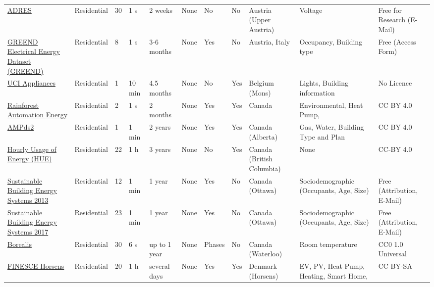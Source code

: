 \begin{tabular}{lllllllllll}
\href{\url{https://www.ea.tuwien.ac.at/projects/adres_concept/EN/}}{ADRES} & Residential &30 &  1 s &  2 weeks &  None &  No &  No &Austria (Upper Austria) &Voltage &  Free for Research (E-Mail) \\
\href{\url{https://sourceforge.net/projects/greend/}}{GREEND Electrical Energy Dataset (GREEND)} & Residential & 8 &  1 s &   3-6 months &  None & Yes &  No & Austria, Italy &   Occupancy, Building type &  Free (Access Form) \\
\href{\url{https://archive.ics.uci.edu/ml/datasets/Appliances+energy+prediction}}{UCI Appliances} & Residential & 1 &   10 min &   4.5 months &  None &  No & Yes & Belgium (Mons) &   Lights, Building information &  No Licence \\
\href{\url{https://dataverse.harvard.edu/dataset.xhtml?persistentId=doi:10.7910/DVN/ZJW4LC}}{Rainforest Automation Energy} & Residential & 2 &  1 s & 2 months &  None & Yes & Yes & Canada &  Environmental, Heat Pump, &   CC BY 4.0 \\
\href{\url{https://dataverse.harvard.edu/dataset.xhtml?persistentId=doi:10.7910/DVN/FIE0S4}}{AMPds2} & Residential & 1 &1 min &  2 years &  None & Yes & Yes &   Canada (Alberta) & Gas, Water, Building Type and Plan &   CC BY 4.0 \\
\href{\url{https://dataverse.harvard.edu/dataset.xhtml?persistentId=doi:10.7910/DVN/N3HGRN}}{Hourly Usage of Energy (HUE)} & Residential &22 &  1 h &  3 years &  None &  No & Yes &  Canada (British Columbia) &   None &   CC-BY 4.0 \\
\href{\url{https://carleton.ca/sbes/publications/electric-demand-profiles-downloadable/}}{Sustainable Building Energy Systems 2013} & Residential &12 &1 min &   1 year &  None & Yes &  No &Canada (Ottawa) &Sociodemographic (Occupants, Age, Size) &  Free (Attribution, E-Mail) \\
\href{\url{https://carleton.ca/sbes/publications/electric-demand-profiles-downloadable/}}{Sustainable Building Energy Systems 2017} & Residential &23 &1 min &   1 year &  None & Yes &  No &Canada (Ottawa) &Sociodemographic (Occupants, Age, Size) &  Free (Attribution, E-Mail) \\
\href{\url{https://doi.org/10.5683/SP2/R4SVBF}}{Borealis} & Residential &30 &  6 s & up to 1 year &  None &  Phases &  No &  Canada (Waterloo) &   Room temperature &   CC0 1.0 Universal \\
\href{\url{https://data.lab.fiware.org/organization/9569f9bd-42bd-414f-b8d9-112553ea9dfb?tags=FINESCE}}{FINESCE Horsens} & Residential &20 &  1 h & several days &  None & Yes & Yes &  Denmark (Horsens) &EV, PV, Heat Pump, Heating, Smart Home, &CC BY-SA \\

\end{tabular}
